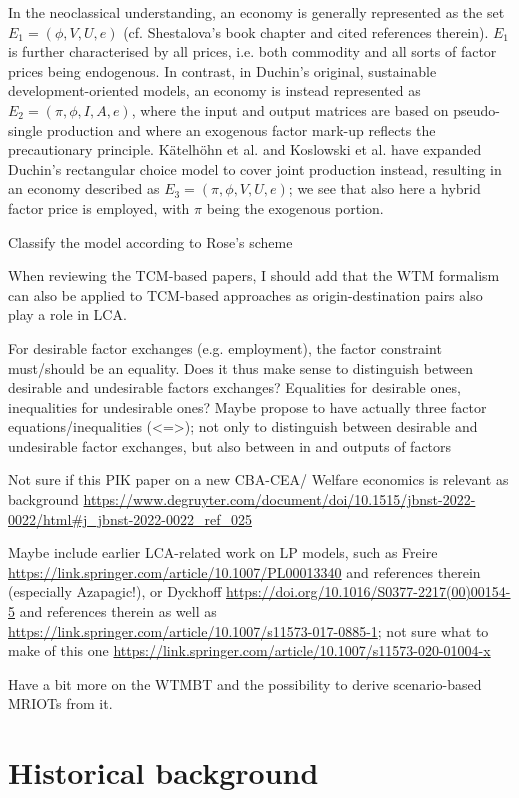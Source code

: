 \documentclass{article}
\begin{document}
\begin{refsection}
In the neoclassical understanding, an economy is generally represented as the set $E_{1} = (\phi, V, U, e)$ (cf. Shestalova's book chapter and cited references therein). $E_{1}$ is further characterised by all prices, i.e. both commodity and all sorts of factor prices being endogenous. In contrast, in Duchin's original, sustainable development-oriented models, an economy is instead represented as $E_{2} = (\pi, \phi, I, A, e)$, where the input and output matrices are based on pseudo-single production and where an exogenous factor mark-up reflects the precautionary principle. Kätelhöhn et al. and Koslowski et al. have expanded Duchin's rectangular choice model to cover joint production instead, resulting in an economy described as $E_{3} = (\pi, \phi, V, U, e)$; we see that also here a hybrid factor price is employed, with $\pi$ being the exogenous portion.

Classify the model according to Rose's scheme

When reviewing the TCM-based papers, I should add that the WTM formalism can also be applied to TCM-based approaches as origin-destination pairs also play a role in LCA.

For desirable factor exchanges (e.g. employment), the factor constraint must/should be an equality. Does it thus make sense to distinguish between desirable and undesirable factors exchanges? Equalities for desirable ones, inequalities for undesirable ones?
Maybe propose to have actually three factor equations/inequalities (<=>); not only to distinguish between desirable and undesirable factor exchanges, but also between in and outputs of factors

Not sure if this PIK paper on a new CBA-CEA/ Welfare economics is relevant as background \url{https://www.degruyter.com/document/doi/10.1515/jbnst-2022-0022/html#j_jbnst-2022-0022_ref_025}

Maybe include earlier LCA-related work on LP models, such as Freire \url{https://link.springer.com/article/10.1007/PL00013340} and references therein (especially Azapagic!), or Dyckhoff \url{https://doi.org/10.1016/S0377-2217(00)00154-5} and references therein as well as \url{https://link.springer.com/article/10.1007/s11573-017-0885-1}; not sure what to make of this one \url{https://link.springer.com/article/10.1007/s11573-020-01004-x}

Have a bit more on the WTMBT and the possibility to derive scenario-based MRIOTs from it.

\section{Historical background}


\end{refsection}
\end{document}
